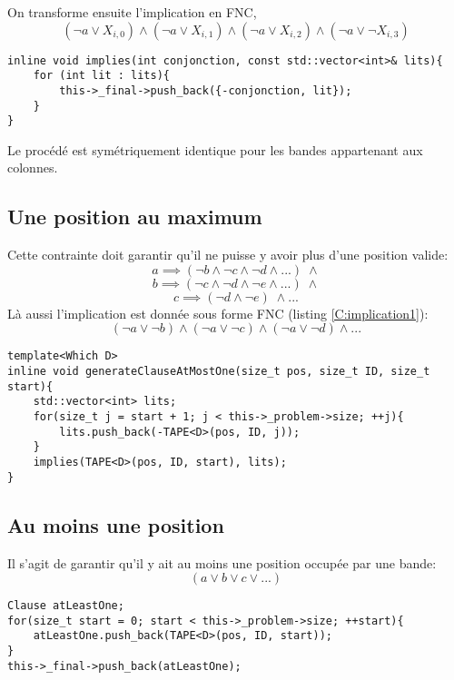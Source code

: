 \documentclass[a4paper,12pt]{report}
\begin{document}
On transforme ensuite l'implication en FNC,
$$(\lnot a \vee X_{i,0}) \wedge ( \lnot a \vee X_{i,1}) \wedge ( \lnot a \vee X_{i,2}) \wedge (\lnot a \vee \lnot X_{i,3})$$
\lstset{style=Cpp, caption=Implication en FNC, label=C:implication1}
\begin{lstlisting}[mathescape=true]
inline void implies(int conjonction, const std::vector<int>& lits){
	for (int lit : lits){
		this->_final->push_back({-conjonction, lit});
	}
}
\end{lstlisting}

Le procédé est symétriquement identique pour les bandes appartenant aux colonnes.

\subsection{Une position au maximum}
Cette contrainte doit garantir qu'il ne puisse y avoir plus d'une position valide:
$$a \implies (\lnot b \wedge \lnot c \wedge \lnot d \wedge ... )\; \wedge$$
$$b \implies (\lnot c \wedge \lnot d \wedge \lnot e \wedge ... )\; \wedge$$
$$c \implies (\lnot d \wedge \lnot e)\; \wedge ...$$
Là aussi l'implication est donnée sous forme FNC (listing \ref{C:implication1}): 
$$(\lnot a \vee \lnot b) \wedge (\lnot a \vee \lnot c) \wedge (\lnot a \vee \lnot d) \wedge ...$$

\lstset{style=Cpp, caption=Au moins une position, label=C:atMostOne}
\begin{lstlisting}[mathescape=true]
template<Which D>
inline void generateClauseAtMostOne(size_t pos, size_t ID, size_t start){
	std::vector<int> lits;
	for(size_t j = start + 1; j < this->_problem->size; ++j){
		lits.push_back(-TAPE<D>(pos, ID, j));
	}
	implies(TAPE<D>(pos, ID, start), lits);
}
\end{lstlisting}

\subsection{Au moins une position}

Il s'agit de garantir qu'il y ait au moins une position occupée par une bande:
$$(a \vee b \vee c \vee ...)$$
\lstset{style=Cpp, caption=Au moins une position, label=C:atMostOne}
\begin{lstlisting}[mathescape=true]
Clause atLeastOne;
for(size_t start = 0; start < this->_problem->size; ++start){
	atLeastOne.push_back(TAPE<D>(pos, ID, start));
}
this->_final->push_back(atLeastOne);
\end{lstlisting}
\end{document}
